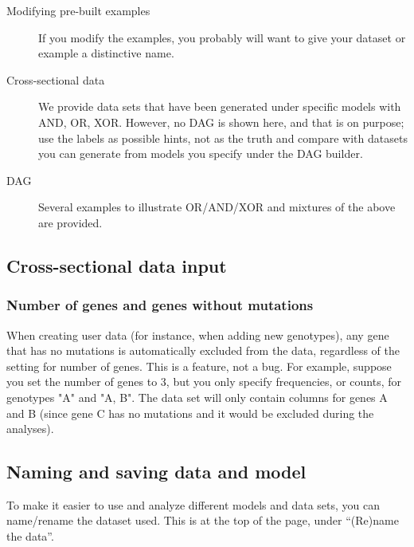 \documentclass[a4paper,11pt]{article}
\begin{document}
\begin{description}
\item[Modifying pre-built examples] If you modify the examples, you probably will want to give your dataset or example a distinctive name.

  
\item[Cross-sectional data] We provide data sets that have been generated under specific models with AND, OR, XOR. However, no DAG is shown here, and that is on purpose; use the labels as possible hints, not as the truth and compare with datasets you can generate from models you specify under the DAG builder.

\item[DAG] Several examples to illustrate OR/AND/XOR and mixtures of the above are provided.
  
\end{description}


\subsection{Cross-sectional data input}
\label{sec:cross-sectional-data}

\subsubsection{Number of genes and genes without mutations}
\label{sec:number-genes-genes}

 When creating user data (for instance, when adding new genotypes), any gene that has no mutations is automatically excluded from the data, regardless of the setting for number of genes. This is a feature, not a bug. For example, suppose you set the number of genes to 3, but you only specify frequencies, or counts, for genotypes "A" and "A, B". The data set will only contain columns for genes A and B (since gene C has no mutations and it would be excluded during the analyses).


 \subsection{Naming and saving data and model}
 \label{shiny-save}

 To make it easier to use and analyze different models and data sets, you can name/rename the dataset used. This is at the top of the page, under ``(Re)name the data''.
\end{document}
